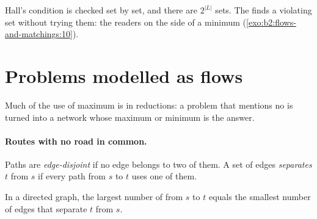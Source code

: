 Hall's condition is checked set by set, and there are $2^{|L|}$ sets. The  finds a violating set without trying
them: the readers on the  side of a minimum  (\cref{exo:b2:flows-and-matchings:10}).

\label{lst:b2:flows-and-matchings:hall}

\label{out:b2:flows-and-matchings:hall}

\section{Problems modelled as flows}\label{sec:b2:flows-and-matchings:modelling}

Much of the use of maximum  is in reductions: a problem that mentions no  is turned into a network whose
maximum  or minimum  is the answer.

\paragraph{Routes with no road in common.}

\begin{definition}\label{def:b2:flows-and-matchings:disjoint}
Paths are \emph{edge-disjoint} if no edge belongs to two of them. A set of edges
\emph{separates} $t$ from $s$ if every path from $s$ to $t$ uses one of them.
\end{definition}

\begin{theorem}[Menger]\label{thm:b2:flows-and-matchings:menger}
In a directed graph, the largest number of  from $s$ to $t$ equals the smallest number of edges that
separate $t$ from $s$.
\end{theorem}

